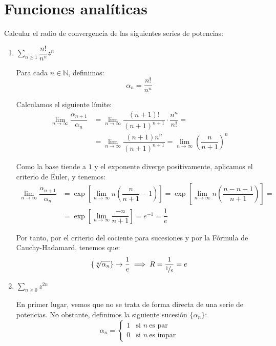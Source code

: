 \section{Funciones analíticas}

\begin{ejercicio}
    Calcular el radio de convergencia de las siguientes series de potencias:
    \begin{enumerate}
        \item $\displaystyle \sum_{n \geq 1} \dfrac{n!}{n^n}z^n$
        
        Para cada $n\in \mathbb{N}$, definimos:
        \[
            \alpha_n = \dfrac{n!}{n^n}
        \]

        Calculamos el siguiente límite:
        \begin{align*}
            \lim_{n \to \infty} \dfrac{\alpha_{n+1}}{\alpha_n} &= \lim_{n \to \infty} \dfrac{(n+1)!}{(n+1)^{n+1}} \cdot \dfrac{n^n}{n!}
            =\\ &= \lim_{n \to \infty} \dfrac{(n+1)n^n}{(n+1)^{n+1}}
            = \lim_{n \to \infty} \left(\dfrac{n}{n+1}\right)^n
        \end{align*}

        Como la base tiende a $1$ y el exponente diverge positivamente, aplicamos el criterio de Euler, y tenemos:
        \begin{align*}
            \lim_{n \to \infty} \dfrac{\alpha_{n+1}}{\alpha_n} &=
            \exp\left[\lim_{n \to \infty} n\left(\dfrac{n}{n+1}-1\right)\right]
            = \exp\left[\lim_{n \to \infty} n\left(\dfrac{n-n-1}{n+1}\right)\right]
            =\\&= \exp\left[\lim_{n \to \infty} \dfrac{-n}{n+1}\right]
            = e^{-1} = \dfrac{1}{e}
        \end{align*}

        Por tanto, por el criterio del cociente para sucesiones y por la Fórmula de Cauchy-Hadamard, tenemos que:
        \begin{equation*}
            \{\sqrt[n]{\alpha_n}\} \to \dfrac{1}{e} \implies R = \dfrac{1}{\nicefrac{1}{e}} = e
        \end{equation*}
        \item $\displaystyle \sum_{n \geq 0} z^{2n}$
        
        En primer lugar, vemos que no se trata de forma directa de una serie de potencias. No obstante, definimos la siguiente sucesión $\{\alpha_n\}$:
        \[
            \alpha_n = \begin{cases}
                1 & \text{si } n\ \text{es par}\\
                0 & \text{si } n\ \text{es impar}
            \end{cases}
        \]


\end{enumerate}
\end{ejercicio}
